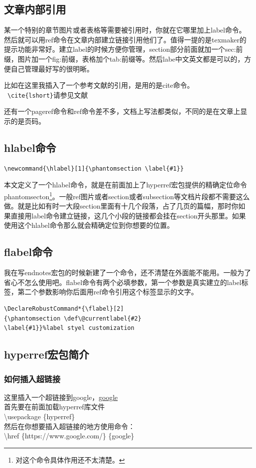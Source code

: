 \documentclass[12pt,oneside]{book}
\begin{document}
\begin{common-format}
\subsection{文章内部引用}
某一个特别的章节图片或者表格等需要被引用时，你就在它哪里加上label命令。然后就可以用ref命令在文章内部建立链接引用他们了。值得一提的是texmaker的提示功能非常好。建立label的时候方便你管理，section部分前面就加一个sec:前缀，图片加一个fig:前缀，表格加个tab:前缀等。然后labe中文英文都是可以的，方便自己管理最好写的很明晰。

比如在这里我插入了一个参考文献的引用，是用的是cite命令。\\
\verb+ \cite{lshort}+请参见文献\cite{lshort}

还有一个pageref命令和ref命令差不多，文档上写法都类似，不同的是在文章上显示的是页码。

\subsection{hlabel命令}
\begin{Verbatim}
\newcommand{\hlabel}[1]{\phantomsection \label{#1}}
\end{Verbatim}

本文定义了一个hlabel命令，就是在前面加上了hyperref宏包提供的精确定位命令phantomsecton\footnote{对这个命令具体作用还不太清楚。}。一般ref图片或者section或者subsection等文档片段都不需要这么做。就是比如有时一大段section里面有十几个段落，占了几页的篇幅，那时你如果直接用label命令建立链接，这几个小段的链接都会挂在section开头那里。如果使用这个hlabel命令那么就会精确定位到你想要的位置。


\subsection{flabel命令}
我在写endnotes宏包的时候新建了一个命令，还不清楚在外面能不能用。一般为了省心不怎么使用吧。flabel命令有两个必填参数，第一个参数是真实建立的label标签，第二个参数影响你后面用ref命令引用这个标签显示的文字。
\begin{Verbatim}
\DeclareRobustCommand*{\flabel}[2]
{\phantomsection \def\@currentlabel{#2}
\label{#1}}%label styel customization
\end{Verbatim}


\subsection{hyperref宏包简介}
\subsubsection{如何插入超链接}
这里插入一个超链接到google，\href{https://www.google.com/}{google}\\
首先要在前面加载hyperref库文件\\
\textbackslash usepackage \{hyperref\}\\
然后在你想要插入超链接的地方使用命令：\\
\textbackslash href \{https://www.google.com/\} \{google\}


\end{common-format}
\end{document}
